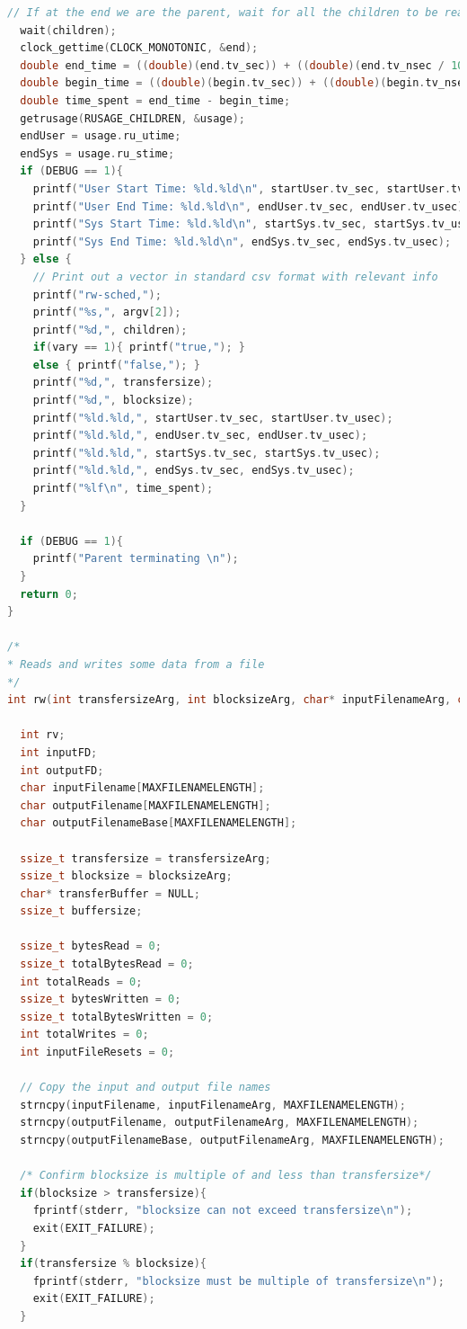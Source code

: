 \documentclass{article}
\begin{document}
\begin{lstlisting}[language=c]
  // If at the end we are the parent, wait for all the children to be reaped
  wait(children);
  clock_gettime(CLOCK_MONOTONIC, &end);
  double end_time = ((double)(end.tv_sec)) + ((double)(end.tv_nsec / 10000000) / 100); // sec + decimal
  double begin_time = ((double)(begin.tv_sec)) + ((double)(begin.tv_nsec / 10000000) / 100); // sec + decimal
  double time_spent = end_time - begin_time;
  getrusage(RUSAGE_CHILDREN, &usage);
  endUser = usage.ru_utime;
  endSys = usage.ru_stime;
  if (DEBUG == 1){
    printf("User Start Time: %ld.%ld\n", startUser.tv_sec, startUser.tv_usec);
    printf("User End Time: %ld.%ld\n", endUser.tv_sec, endUser.tv_usec);
    printf("Sys Start Time: %ld.%ld\n", startSys.tv_sec, startSys.tv_usec);
    printf("Sys End Time: %ld.%ld\n", endSys.tv_sec, endSys.tv_usec);
  } else {
    // Print out a vector in standard csv format with relevant info
    printf("rw-sched,");
    printf("%s,", argv[2]);
    printf("%d,", children);
    if(vary == 1){ printf("true,"); }
    else { printf("false,"); }
    printf("%d,", transfersize);
    printf("%d,", blocksize);
    printf("%ld.%ld,", startUser.tv_sec, startUser.tv_usec);
    printf("%ld.%ld,", endUser.tv_sec, endUser.tv_usec);
    printf("%ld.%ld,", startSys.tv_sec, startSys.tv_usec);
    printf("%ld.%ld,", endSys.tv_sec, endSys.tv_usec);
    printf("%lf\n", time_spent);
  }

  if (DEBUG == 1){
    printf("Parent terminating \n");
  }
  return 0;
}

/*
* Reads and writes some data from a file
*/
int rw(int transfersizeArg, int blocksizeArg, char* inputFilenameArg, char* outputFilenameArg){

  int rv;
  int inputFD;
  int outputFD;
  char inputFilename[MAXFILENAMELENGTH];
  char outputFilename[MAXFILENAMELENGTH];
  char outputFilenameBase[MAXFILENAMELENGTH];

  ssize_t transfersize = transfersizeArg;
  ssize_t blocksize = blocksizeArg;
  char* transferBuffer = NULL;
  ssize_t buffersize;

  ssize_t bytesRead = 0;
  ssize_t totalBytesRead = 0;
  int totalReads = 0;
  ssize_t bytesWritten = 0;
  ssize_t totalBytesWritten = 0;
  int totalWrites = 0;
  int inputFileResets = 0;

  // Copy the input and output file names
  strncpy(inputFilename, inputFilenameArg, MAXFILENAMELENGTH);
  strncpy(outputFilename, outputFilenameArg, MAXFILENAMELENGTH);
  strncpy(outputFilenameBase, outputFilenameArg, MAXFILENAMELENGTH);

  /* Confirm blocksize is multiple of and less than transfersize*/
  if(blocksize > transfersize){
  	fprintf(stderr, "blocksize can not exceed transfersize\n");
  	exit(EXIT_FAILURE);
  }
  if(transfersize % blocksize){
  	fprintf(stderr, "blocksize must be multiple of transfersize\n");
  	exit(EXIT_FAILURE);
  }


\end{lstlisting}
\end{document}
